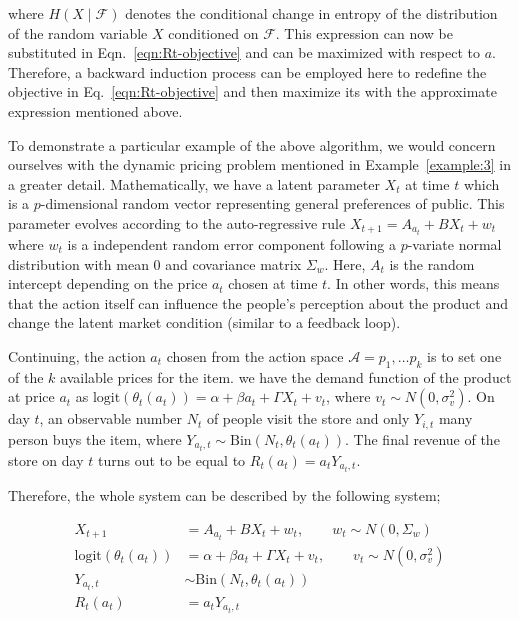 \documentclass[11pt]{article}
\newcommand{\Fcal}{\mathcal{F}}
\begin{document}
\noindent where $H(X \mid \Fcal)$ denotes the conditional change in entropy of the distribution of the random variable $X$ conditioned on $\Fcal$. This expression can now be substituted in Eqn.~\eqref{eqn:Rt-objective} and can be maximized with respect to $a$. Therefore, a backward induction process can be employed here to redefine the objective in Eq.~\eqref{eqn:Rt-objective} and then maximize its with the approximate expression mentioned above.

To demonstrate a particular example of the above algorithm, we would concern ourselves with the dynamic pricing problem mentioned in Example~\ref{example:3} in a greater detail. Mathematically, we have a latent parameter $X_t$ at time $t$ which is a $p$-dimensional random vector representing general preferences of public. This parameter evolves according to the auto-regressive rule $X_{t+1} = A_{a_t} + B X_t + w_t$ where $w_t$ is a independent random error component following a $p$-variate normal distribution with mean $0$ and covariance matrix $\Sigma_w$. Here, $A_t$ is the random intercept depending on the price $a_t$ chosen at time $t$. In other words, this means that the action itself can influence the people's perception about the product and change the latent market condition (similar to a feedback loop). 

Continuing, the action $a_t$ chosen from the action space $\mathcal{A} = {p_1, \dots p_k}$ is to set one of the $k$ available prices for the item. we have the demand function of the product at price $a_t$ as $\text{logit}(\theta_t(a_t)) = \alpha + \beta a_t + \Gamma X_t + v_t$, where $v_t \sim N(0, \sigma^2_v)$. On day $t$, an observable number $N_t$ of people visit the store and only $Y_{i, t}$ many person buys the item, where $Y_{a_t,t} \sim \text{Bin}(N_t, \theta_t(a_t))$. The final revenue of the store on day $t$ turns out to be equal to $R_t(a_t) = a_t Y_{a_t,t}$. 

Therefore, the whole system can be described by the following system;

\begin{align}
    X_{t+1} & = A_{a_t} + B X_t + w_t, \qquad w_t \sim N(0, \Sigma_w)\label{eqn:setup-1}\\
    \text{logit}(\theta_t(a_t)) & = \alpha + \beta a_t + \Gamma X_t + v_t, \qquad v_t \sim N(0, \sigma^2_v)\label{eqn:setup-2}\\
    Y_{a_t, t} & \sim \text{Bin}(N_t, \theta_t(a_t))\label{eqn:setup-3}\\
    R_t(a_t) & = a_t Y_{a_t, t}\label{eqn:setup-4}
\end{align}
\end{document}

